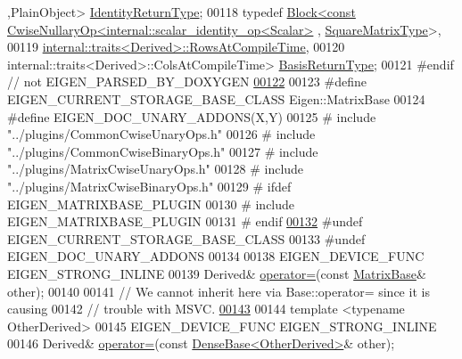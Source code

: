 \begin{DoxyCode}
      ,PlainObject> \hyperlink{group___core___module_class_eigen_1_1_cwise_nullary_op}{IdentityReturnType};
00118     \textcolor{keyword}{typedef} \hyperlink{group___core___module_class_eigen_1_1_block}{Block<const CwiseNullaryOp<internal::scalar\_identity\_op<Scalar>}
      , \hyperlink{group___core___module_class_eigen_1_1_matrix}{SquareMatrixType}>,
00119                   \hyperlink{struct_eigen_1_1internal_1_1traits}{internal::traits<Derived>::RowsAtCompileTime},
00120                   internal::traits<Derived>::ColsAtCompileTime> \hyperlink{group___core___module_class_eigen_1_1_block}{BasisReturnType};
00121 \textcolor{preprocessor}{#endif // not EIGEN\_PARSED\_BY\_DOXYGEN}
\hyperlink{group___core___module_a03db69599e5dc10f9b7524bbdd0bdcbb}{00122} 
00123 \textcolor{preprocessor}{#define EIGEN\_CURRENT\_STORAGE\_BASE\_CLASS Eigen::MatrixBase}
00124 \textcolor{preprocessor}{#define EIGEN\_DOC\_UNARY\_ADDONS(X,Y)}
00125 \textcolor{preprocessor}{#   include "../plugins/CommonCwiseUnaryOps.h"}
00126 \textcolor{preprocessor}{#   include "../plugins/CommonCwiseBinaryOps.h"}
00127 \textcolor{preprocessor}{#   include "../plugins/MatrixCwiseUnaryOps.h"}
00128 \textcolor{preprocessor}{#   include "../plugins/MatrixCwiseBinaryOps.h"}
00129 \textcolor{preprocessor}{#   ifdef EIGEN\_MATRIXBASE\_PLUGIN}
00130 \textcolor{preprocessor}{#     include EIGEN\_MATRIXBASE\_PLUGIN}
00131 \textcolor{preprocessor}{#   endif}
\hyperlink{group___core___module_ad2a4070503e44b1f9e7fc99b4cb5697b}{00132} \textcolor{preprocessor}{#undef EIGEN\_CURRENT\_STORAGE\_BASE\_CLASS}
00133 \textcolor{preprocessor}{#undef EIGEN\_DOC\_UNARY\_ADDONS}
00134 
00138     EIGEN\_DEVICE\_FUNC EIGEN\_STRONG\_INLINE
00139     Derived& \hyperlink{group___core___module_a706a4dd1ee54786e9210de1a4bf02600}{operator=}(\textcolor{keyword}{const} \hyperlink{group___core___module_class_eigen_1_1_matrix_base}{MatrixBase}& other);
00140 
00141     \textcolor{comment}{// We cannot inherit here via Base::operator= since it is causing}
00142     \textcolor{comment}{// trouble with MSVC.}
\hyperlink{group___core___module_a302dec31d512edd5781f059c08e3179c}{00143} 
00144     \textcolor{keyword}{template} <\textcolor{keyword}{typename} OtherDerived>
00145     EIGEN\_DEVICE\_FUNC EIGEN\_STRONG\_INLINE
00146     Derived& \hyperlink{group___core___module_a706a4dd1ee54786e9210de1a4bf02600}{operator=}(\textcolor{keyword}{const} \hyperlink{group___core___module_class_eigen_1_1_dense_base}{DenseBase<OtherDerived>}& other);

\end{DoxyCode}
